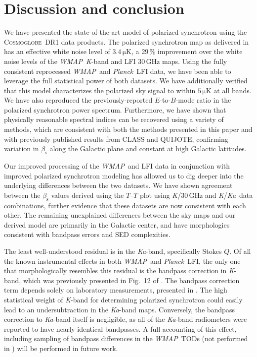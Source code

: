\documentclass[twocolumn]{../../common/aa}
\def\WMAP{\emph{WMAP}}
\def\Planck{\emph{Planck}}
\newcommand{\cosmoglobe}{\textsc{Cosmoglobe}}
\newcommand{\K}[0]{\textit K}
\newcommand{\Ka}[0]{\textit{Ka}}
\begin{document}
\section{Discussion and conclusion}
\label{sec:conclusion}

We have presented the state-of-the-art model of polarized synchrotron using the \cosmoglobe\ DR1 data products. The polarized synchrotron map as delivered in \citet{watts2023_dr1} has an effective white noise level of $3.4\,\mathrm{\mu K}$, a 29\,\% improvement over the white noise levels of the \WMAP\ \K-band and LFI 30\,GHz maps. Using the fully consistent reprocessed \WMAP\ and \Planck\ LFI data, we have been able to leverage the full statistical power of both datasets. We have additionally verified that this model characterizes the polarized sky signal to within $5\,\mathrm{\mu K}$ at all bands. We have also reproduced the previously-reported $E$-to-$B$-mode ratio in the polarized synchrotron power spectrum. Furthermore, we have shown that physically reasonable spectral indices can be recovered using a variety of methods, which are consistent with both the methods presented in this paper and with previously published results from CLASS and QUIJOTE, confirming variation in $\beta_\mathrm s$ along the Galactic plane and constant at high Galactic latitudes.


Our improved processing of the \WMAP\ and LFI data in conjunction with improved polarized synchrotron modeling has allowed us to dig deeper into the underlying differences between the two datasets. We have shown agreement between the $\beta_\mathrm s$ values derived using the $T$--$T$ plot using \K/30\,GHz and \K/\Ka\ data combinations, further evidence that these datasets are now consistent with each other. The remaining unexplained differences between the sky maps and our derived model are primarily in the Galactic center, and have morphologies consistent with bandpass errors and SED complexities.


The least well-understood residual is in the \Ka-band, specifically Stokes $Q$. Of all the known instrumental effects in both \WMAP\ and \Planck\ LFI, the only one that morphologically resembles this residual is the bandpass correction in \K-band, which was previously presented in Fig.~12 of \citet{watts2023_dr1}. The bandpass correction term depends solely on laboratory measurements, presented in \citet{jarosik2003:MAP}. The high statistical weight of \K-band for determining polarized synchrotron could easily lead to an undersubtraction in the \Ka-band maps. Conversely, the bandpass correction to \Ka-band itself is negligible, as all of the \Ka-band radiometers were reported to have nearly identical bandpasses. A full accounting of this effect, including sampling of bandpass differences in the \WMAP\ TODs (not performed in \citealt{watts2023_dr1}) will be performed in future work.
\end{document}
